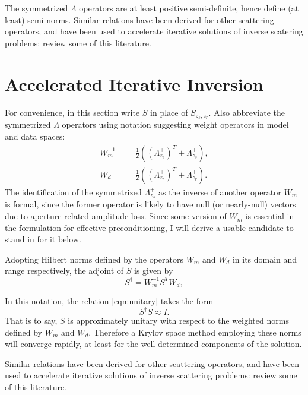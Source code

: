The symmetrized $\Lambda$ operators are at least positive
semi-definite, hence define (at least) semi-norms.
Similar relations have been derived for other scattering operators,
and have been used to accelerate iterative solutions of inverse
scatering problems: \cite{DafniSymes:SEG18b} review some of this
literature.

\section{Accelerated Iterative Inversion}

For convenience, in this section write $S$ in place of
$S^+_{z_s,z_r}$. Also abbreviate the symmetrized $\Lambda$ operators
using notation suggesting weight
operators in model and data spaces:
\begin{eqnarray}
  W_m^{-1}&=& \frac{1}{2}((\Lambda^+_{z_s})^T+
              \Lambda^+_{z_s}),\nonumber \\
  W_d &=& \frac{1}{2}((\Lambda^+_{z_r})^T+ \Lambda^+_{z_r}).
          \label{eqn:wdef}
\end{eqnarray}
The identification of the symmetrized $\Lambda^+_{z_s}$ as the inverse
of another operator $W_m$ is formal, since the former operator is
likely to have null (or nearly-null) vectors due to aperture-related
amplitude loss. Since some version of $W_m$ is essential in the
formulation for effective preconditioning, I will derive a usable
candidate to stand in for it below.

Adopting Hilbert norms defined by the operators $W_m$ and $W_d$ in its
domain and range respectively, the adjoint of $S$ is given by
\begin{equation}
\label{eqn:wadj}
S^{\dagger} = W_m^{-1}S^TW_d,
\end{equation}

In this notation, the relation \ref{eqn:unitary} takes the form
\begin{equation}
  \label{eqn:wunitary}
  S^{\dagger}S \approx I.
\end{equation}
That is to say, $S$ is approximately unitary with respect to the
weighted norms defined by $W_m$ and $W_d$. Therefore a Krylov space
method employing these norms will converge rapidly, at least for the
well-determined components of the solution.

Similar relations have been derived for other scattering operators,  
and have been used to accelerate iterative solutions of inverse  
scattering problems: \cite{DafniSymes:SEG18b} review some of this  
literature. 
 
